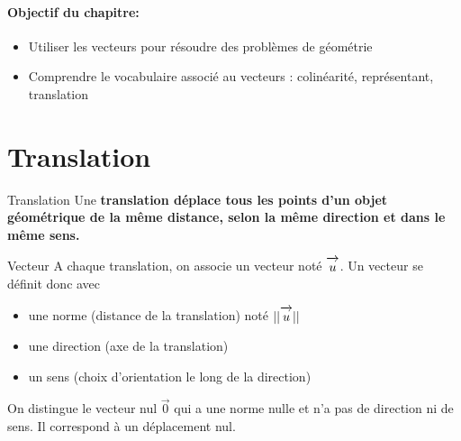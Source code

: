 \documentclass[10pt,a4paper,openany,twoside,prof]{book}
\begin{document}
	\entetegal{}

	\vspace{-7mm}
	\paragraph*{Objectif du chapitre:}
	\begin{itemize}
		\vspace{-2mm}
		\setlength\itemsep{-1mm}
		\item Utiliser les vecteurs pour résoudre des problèmes de géométrie
		\item Comprendre le vocabulaire associé au vecteurs : colinéarité, représentant, translation
	\end{itemize}
	\vspace{-7mm}

\section{Translation}

\begin{defi}{Translation}{}
Une \bf{translation} déplace tous les points d'un objet géométrique de la même distance, selon la même direction et dans le même sens.

\begin{center}
\end{center}

\end{defi}

\begin{defi}{Vecteur}{}
	A chaque translation, on associe un vecteur noté $\overrightarrow{\,\mathstrut u\,}$. Un vecteur se définit donc avec

	\begin{itemize}
		\item
		une norme (distance de la translation) noté $||\overrightarrow{\,\mathstrut u\,}||$
		\item une direction (axe de la translation)
		\item un sens (choix d'orientation le long de la direction)
	\end{itemize}

	On distingue le vecteur nul $\vec{0}$ qui a une norme nulle et n'a pas de direction ni de sens. Il correspond à un déplacement nul.
\end{defi}
\end{document}
